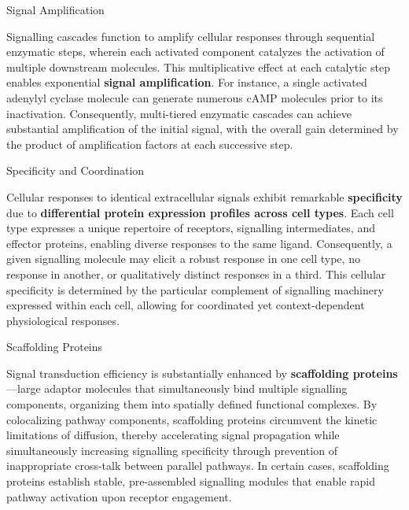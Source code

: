 \documentclass[10pt]{article}
\begin{document}
    \begin{core}{Signal Amplification}

      Signalling cascades function to amplify cellular responses through sequential enzymatic steps, wherein each activated component catalyzes the activation of multiple downstream molecules. This multiplicative effect at each catalytic step enables exponential \textbf{signal amplification}. For instance, a single activated adenylyl cyclase molecule can generate numerous cAMP molecules prior to its inactivation. Consequently, multi-tiered enzymatic cascades can achieve substantial amplification of the initial signal, with the overall gain determined by the product of amplification factors at each successive step.


    \end{core}

    \begin{core}{Specificity and Coordination}

      Cellular responses to identical extracellular signals exhibit remarkable \textbf{specificity} due to \textbf{differential protein expression profiles across cell types}. Each cell type expresses a unique repertoire of receptors, signalling intermediates, and effector proteins, enabling diverse responses to the same ligand. Consequently, a given signalling molecule may elicit a robust response in one cell type, no response in another, or qualitatively distinct responses in a third. This cellular specificity is determined by the particular complement of signalling machinery expressed within each cell, allowing for coordinated yet context-dependent physiological responses.


    \end{core}

    \begin{core}{Scaffolding Proteins}

      Signal transduction efficiency is substantially enhanced by \textbf{scaffolding proteins}---large adaptor molecules that simultaneously bind multiple signalling components, organizing them into spatially defined functional complexes. By colocalizing pathway components, scaffolding proteins circumvent the kinetic limitations of diffusion, thereby accelerating signal propagation while simultaneously increasing signalling specificity through prevention of inappropriate cross-talk between parallel pathways. In certain cases, scaffolding proteins establish stable, pre-assembled signalling modules that enable rapid pathway activation upon receptor engagement.


    \end{core}
\end{document}
